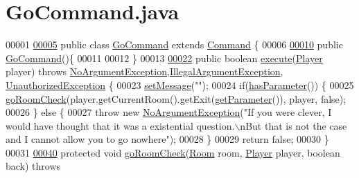 \hypertarget{GoCommand_8java_source}{\section{Go\-Command.\-java}
}

\begin{DoxyCode}
00001 
\hypertarget{GoCommand_8java_source_l00005}{}\hyperlink{classGoCommand}{00005} \textcolor{keyword}{public} \textcolor{keyword}{class }\hyperlink{classGoCommand}{GoCommand} \textcolor{keyword}{extends} \hyperlink{classCommand}{Command} \{
00006 
\hypertarget{GoCommand_8java_source_l00010}{}\hyperlink{classGoCommand_a30d6bd5c2284b97e76ebe702e1cb1d55}{00010}     \textcolor{keyword}{public} \hyperlink{classGoCommand_a30d6bd5c2284b97e76ebe702e1cb1d55}{GoCommand}()\{
00011 
00012     \}
00013 
\hypertarget{GoCommand_8java_source_l00022}{}\hyperlink{classGoCommand_a77a61c2a3b89dca45b51e06f3bcb3ba7}{00022}     \textcolor{keyword}{public} \textcolor{keywordtype}{boolean} \hyperlink{classGoCommand_a77a61c2a3b89dca45b51e06f3bcb3ba7}{execute}(\hyperlink{classPlayer}{Player} player) \textcolor{keywordflow}{throws} 
      \hyperlink{classNoArgumentException}{NoArgumentException},\hyperlink{classIllegalArgumentException}{IllegalArgumentException},
      \hyperlink{classUnauthorizedException}{UnauthorizedException} \{
00023         \hyperlink{classCommand_a715709d8f0ab65879d79ad1725c96f17}{setMessage}(\textcolor{stringliteral}{""});
00024         \textcolor{keywordflow}{if}(\hyperlink{classCommand_a9b042558156d6749566e0fd9d48d3bfe}{hasParameter}()) \{
00025             \hyperlink{classGoCommand_a1fce2ad8ed1faf41fa300064585b3616}{goRoomCheck}(player.getCurrentRoom().getExit(\hyperlink{classCommand_a1ced3739d546770ba1389e6ce228255e}{getParameter}()), player, \textcolor{keyword}{
      false});
00026         \} \textcolor{keywordflow}{else} \{
00027             \textcolor{keywordflow}{throw} \textcolor{keyword}{new} \hyperlink{classNoArgumentException}{NoArgumentException}(\textcolor{stringliteral}{"If you were clever, I would have thought that
       it was a existential question.\(\backslash\)nBut that is not the case and I cannot allow you to go nowhere"});
00028         \}
00029         \textcolor{keywordflow}{return} \textcolor{keyword}{false};
00030     \}
00031 
\hypertarget{GoCommand_8java_source_l00040}{}\hyperlink{classGoCommand_a1fce2ad8ed1faf41fa300064585b3616}{00040}     \textcolor{keyword}{protected} \textcolor{keywordtype}{void} \hyperlink{classGoCommand_a1fce2ad8ed1faf41fa300064585b3616}{goRoomCheck}(\hyperlink{classRoom}{Room} room, \hyperlink{classPlayer}{Player} player, \textcolor{keywordtype}{boolean} back) \textcolor{keywordflow}{throws} 

\end{DoxyCode}
